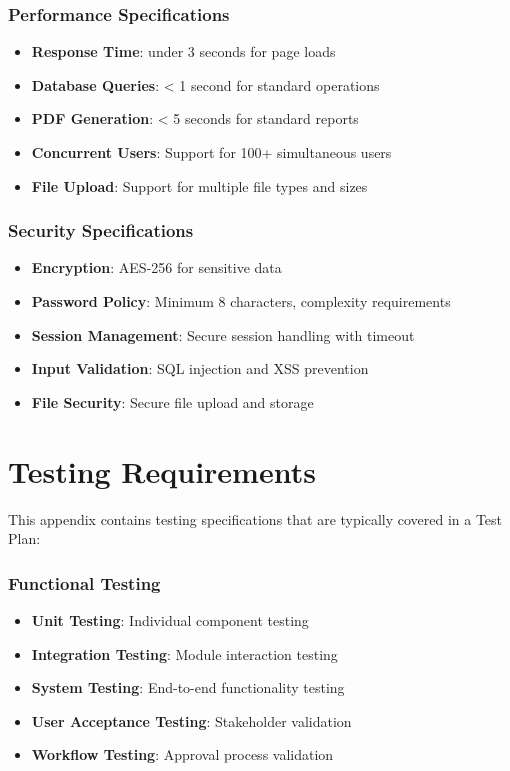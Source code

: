 \documentclass[12pt,a4paper]{article}
\begin{document}
\subsubsection{Performance Specifications}
\begin{itemize}
    \item \textbf{Response Time}: under 3 seconds for page loads
    \item \textbf{Database Queries}: < 1 second for standard operations
    \item \textbf{PDF Generation}: < 5 seconds for standard reports
    \item \textbf{Concurrent Users}: Support for 100+ simultaneous users
    \item \textbf{File Upload}: Support for multiple file types and sizes
\end{itemize}

\subsubsection{Security Specifications}
\begin{itemize}
    \item \textbf{Encryption}: AES-256 for sensitive data
    \item \textbf{Password Policy}: Minimum 8 characters, complexity requirements
    \item \textbf{Session Management}: Secure session handling with timeout
    \item \textbf{Input Validation}: SQL injection and XSS prevention
    \item \textbf{File Security}: Secure file upload and storage
\end{itemize}

\section{Testing Requirements}
This appendix contains testing specifications that are typically covered in a Test Plan:

\subsubsection{Functional Testing}
\begin{itemize}
    \item \textbf{Unit Testing}: Individual component testing
    \item \textbf{Integration Testing}: Module interaction testing
    \item \textbf{System Testing}: End-to-end functionality testing
    \item \textbf{User Acceptance Testing}: Stakeholder validation
    \item \textbf{Workflow Testing}: Approval process validation
\end{itemize}
\end{document}
